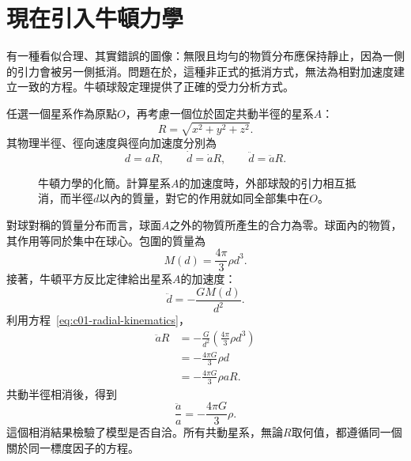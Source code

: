 \section{現在引入牛頓力學}

有一種看似合理、其實錯誤的圖像：無限且均勻的物質分布應保持靜止，因為一側的引力會被另一側抵消。問題在於，這種非正式的抵消方式，無法為相對加速度建立一致的方程。牛頓球殼定理提供了正確的受力分析方式。

任選一個星系作為原點\(O\)，再考慮一個位於固定共動半徑的星系\(A\)：
\begin{equation}
R=\sqrt{x^2+y^2+z^2}.
\end{equation}
其物理半徑、徑向速度與徑向加速度分別為
\begin{equation}
d=aR,
\qquad
\dot d=\dot a R,
\qquad
\ddot d=\ddot a R.
\label{eq:c01-radial-kinematics}
\end{equation}

\begin{figure}[ht]
\centering
{}
\caption{牛頓力學的化簡。計算星系\(A\)的加速度時，外部球殼的引力相互抵消，而半徑\(d\)以內的質量，對它的作用就如同全部集中在\(O\)。}
\label{fig:c01-newton-sphere}
\end{figure}

對球對稱的質量分布而言，球面\(A\)之外的物質所產生的合力為零。球面內的物質，其作用等同於集中在球心。包圍的質量為
\begin{equation}
M(d)=\frac{4\pi}{3}\rho d^3.
\label{eq:c01-enclosed-mass}
\end{equation}
接著，牛頓平方反比定律給出星系\(A\)的加速度：
\begin{equation}
\ddot d=-\frac{GM(d)}{d^2}.
\end{equation}
利用方程~\eqref{eq:c01-radial-kinematics}，
\begin{align}
\ddot a R
&=-\frac{G}{d^2}\left(\frac{4\pi}{3}\rho d^3\right) \\
&=-\frac{4\pi G}{3}\rho d \\
&=-\frac{4\pi G}{3}\rho aR.
\end{align}
共動半徑相消後，得到
\begin{equation}
\boxed{\frac{\ddot a}{a}=-\frac{4\pi G}{3}\rho.}
\label{eq:c01-acceleration}
\end{equation}
這個相消結果檢驗了模型是否自洽。所有共動星系，無論\(R\)取何值，都遵循同一個關於同一標度因子的方程。

